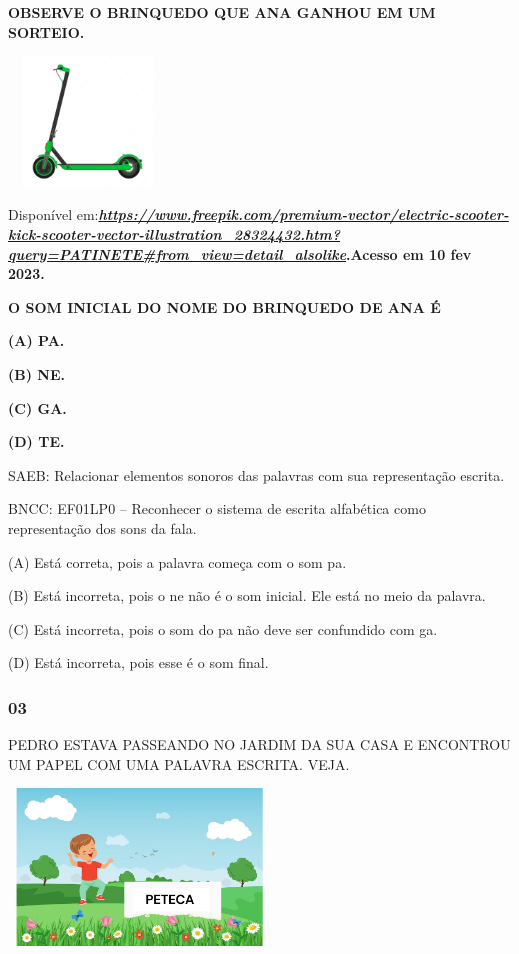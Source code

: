 \textbf{OBSERVE O BRINQUEDO QUE ANA GANHOU EM UM SORTEIO.}

\includegraphics[width=1.65484in,height=1.36089in]{media/image83.png}

Disponível
em:\textbf{\href{https://www.freepik.com/premium-vector/electric-scooter-kick-scooter-vector-illustration_28324432.htm?query=PATINETE\#from_view=detail_alsolike}{\emph{https://www.freepik.com/premium-vector/electric-scooter-kick-scooter-vector-illustration\_28324432.htm?query=PATINETE\#from\_view=detail\_alsolike}}.Acesso
em 10 fev 2023.}

\textbf{O SOM INICIAL DO NOME DO BRINQUEDO DE ANA É}

\textbf{(A) PA.}

\textbf{(B) NE.}

\textbf{(C) GA.}

\textbf{(D) TE.}

SAEB: Relacionar elementos sonoros das palavras com sua representação escrita.

BNCC: EF01LP0 -- Reconhecer o sistema de escrita alfabética como
representação dos sons da fala.

(A) Está correta, pois a palavra começa com o som pa.

(B) Está incorreta, pois o ne não é o som inicial. Ele está no meio da
palavra.

(C) Está incorreta, pois o som do pa não deve ser confundido com ga.

(D) Está incorreta, pois esse é o som final.

\subsubsection{03}\label{section-2}

PEDRO ESTAVA PASSEANDO NO JARDIM DA SUA CASA E ENCONTROU UM PAPEL COM UMA
PALAVRA ESCRITA. VEJA.

\includegraphics[width=2.73976in,height=1.64660in]{media/image84.png}

